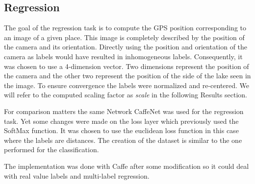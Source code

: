 \subsection{Regression}
The goal of the regression task is to compute the GPS position corresponding to an image of a given place. This image is completely described by the position of the camera and its orientation. Directly using the position and orientation of the camera as labels would have resulted in inhomogeneous labels. Consequently, it was chosen to use a 4-dimension vector. Two dimensions represent the position of the camera and the other two represent the position of the side of the lake seen in the image. To ensure convergence the labels were normalized and re-centered. We will refer to the computed scaling factor as \textit{scale} in the following Results section.

For comparison matters the same Network CaffeNet was used for the regression task. Yet some changes were made on the loss layer which previously used the SoftMax function. It was chosen to use the euclidean loss function in this case where the labels are distances. The creation of the dataset is similar to the one performed for the classification.

The implementation was done with Caffe after some modification so it could deal with real value labels and multi-label regression.
